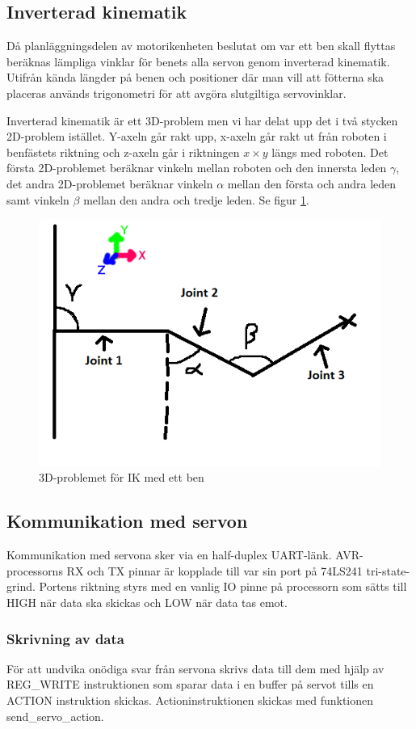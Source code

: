 \documentclass[a4paper,titlepage,12pt]{article}
\begin{document}
	\subsection{Inverterad kinematik}
	\label{sub:inverterad-kinematik}
	Då planläggningsdelen av motorikenheten beslutat om var ett ben skall flyttas beräknas 
	lämpliga vinklar för benets alla servon genom inverterad kinematik. Utifrån kända 
	längder på benen och positioner där man vill att fötterna ska placeras används 
	trigonometri för att avgöra slutgiltiga servovinklar.
	
	Inverterad kinematik är ett 3D-problem men vi har delat upp det i två
    stycken 2D-problem istället. Y-axeln går rakt upp, x-axeln går rakt ut från
    roboten i benfästets riktning och z-axeln går i riktningen $x \times y$
    längs med roboten. Det första 2D-problemet beräknar vinkeln mellan roboten
    och den innersta leden $\gamma$, det andra 2D-problemet beräknar vinkeln
    $\alpha$ mellan den första och andra leden samt vinkeln $\beta$ mellan den
    andra och tredje leden. Se figur \ref{fig:ik}.
	
	
	\begin{figure}[h!]
		\centering
		\includegraphics[width=0.5\linewidth]{images/ik.png}
		\caption{3D-problemet för IK med ett ben
		\label{fig:ik}}
	\end{figure}

	\subsection{Kommunikation med servon}
	Kommunikation med servona sker via en half-duplex UART-länk. AVR-processorns RX
	och TX pinnar är kopplade till var sin port på 74LS241 tri-state-grind. Portens riktning
	styrs med en vanlig IO pinne på processorn som sätts till HIGH när data ska skickas 
	och LOW när data tas emot. 

	\subsubsection{Skrivning av data}
	För att undvika onödiga svar från servona skrivs data till dem med hjälp av REG\_WRITE
	instruktionen som sparar data i en buffer på servot tills en ACTION instruktion skickas.
	Actioninstruktionen skickas med funktionen send\_servo\_action.
	
\end{document}
